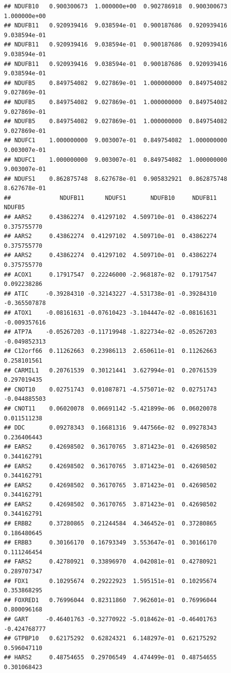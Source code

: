 \documentclass[
]{article}
\begin{document}
\begin{verbatim}
## NDUFB10   0.900300673  1.000000e+00  0.902786918  0.900300673  1.000000e+00
## NDUFB11   0.920939416  9.038594e-01  0.900187686  0.920939416  9.038594e-01
## NDUFB11   0.920939416  9.038594e-01  0.900187686  0.920939416  9.038594e-01
## NDUFB11   0.920939416  9.038594e-01  0.900187686  0.920939416  9.038594e-01
## NDUFB5    0.849754082  9.027869e-01  1.000000000  0.849754082  9.027869e-01
## NDUFB5    0.849754082  9.027869e-01  1.000000000  0.849754082  9.027869e-01
## NDUFB5    0.849754082  9.027869e-01  1.000000000  0.849754082  9.027869e-01
## NDUFC1    1.000000000  9.003007e-01  0.849754082  1.000000000  9.003007e-01
## NDUFC1    1.000000000  9.003007e-01  0.849754082  1.000000000  9.003007e-01
## NDUFS1    0.862875748  8.627678e-01  0.905832921  0.862875748  8.627678e-01
##              NDUFB11      NDUFS1       NDUFB10     NDUFB11       NDUFB5
## AARS2     0.43862274  0.41297102  4.509710e-01  0.43862274  0.375755770
## AARS2     0.43862274  0.41297102  4.509710e-01  0.43862274  0.375755770
## AARS2     0.43862274  0.41297102  4.509710e-01  0.43862274  0.375755770
## ACOX1     0.17917547  0.22246000 -2.968187e-02  0.17917547  0.092238286
## ATIC     -0.39284310 -0.32143227 -4.531738e-01 -0.39284310 -0.365507878
## ATOX1    -0.08161631 -0.07610423 -3.104447e-02 -0.08161631 -0.009357616
## ATP7A    -0.05267203 -0.11719948 -1.822734e-02 -0.05267203 -0.049852313
## C12orf66  0.11262663  0.23986113  2.650611e-01  0.11262663  0.258101561
## CARMIL1   0.20761539  0.30121441  3.627994e-01  0.20761539  0.297019435
## CNOT10    0.02751743  0.01087871 -4.575071e-02  0.02751743 -0.044885503
## CNOT11    0.06020078  0.06691142 -5.421899e-06  0.06020078  0.011511238
## DDC       0.09278343  0.16681316  9.447566e-02  0.09278343  0.236406443
## EARS2     0.42698502  0.36170765  3.871423e-01  0.42698502  0.344162791
## EARS2     0.42698502  0.36170765  3.871423e-01  0.42698502  0.344162791
## EARS2     0.42698502  0.36170765  3.871423e-01  0.42698502  0.344162791
## EARS2     0.42698502  0.36170765  3.871423e-01  0.42698502  0.344162791
## ERBB2     0.37280865  0.21244584  4.346452e-01  0.37280865  0.186480645
## ERBB3     0.30166170  0.16793349  3.553647e-01  0.30166170  0.111246454
## FARS2     0.42780921  0.33896970  4.042081e-01  0.42780921  0.289707347
## FDX1      0.10295674  0.29222923  1.595151e-01  0.10295674  0.353868295
## FOXRED1   0.76996044  0.82311860  7.962601e-01  0.76996044  0.800096168
## GART     -0.46401763 -0.32770922 -5.018462e-01 -0.46401763 -0.424768777
## GTPBP10   0.62175292  0.62824321  6.148297e-01  0.62175292  0.596047110
## HARS2     0.48754655  0.29706549  4.474499e-01  0.48754655  0.301068423

\end{verbatim}
\end{document}

